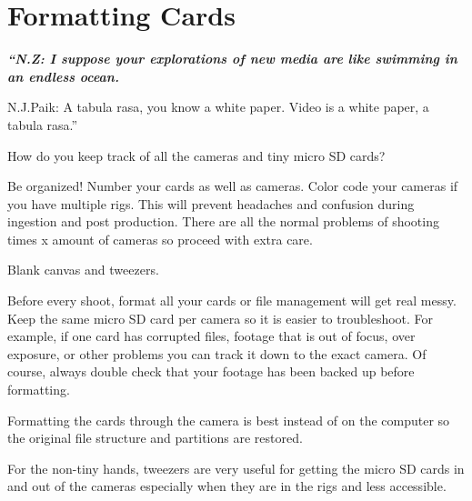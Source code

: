 \chapter{Formatting Cards}
\pagecolor{white}
\label{chap:4}
\begin{fullwidth}


{\itshape\bfseries “N.Z: I suppose your explorations of new media are like swimming in an endless ocean. 

N.J.Paik: A tabula rasa, you know a white paper. Video is a white paper, a tabula rasa.”}

\vspace{\baselineskip}

\problem

{\large How do you keep track of all the cameras and tiny micro SD cards? \par}

Be organized! Number your cards as well as cameras. Color code your cameras if you have multiple rigs. This will prevent headaches and confusion during ingestion and post production. There are all the normal problems of shooting times x amount of cameras so proceed with extra care. 


\solution

{\large Blank canvas and tweezers.
 \par}

Before every shoot, format all your cards or file management will get real messy. Keep the same micro SD card per camera so it is easier to troubleshoot. For example, if one card has corrupted files, footage that is out of focus, over exposure, or other problems you can track it down to the exact camera. Of course, always double check that your footage has been backed up before formatting. 

Formatting the cards through the camera is best instead of on the computer so the original file structure and partitions are restored. 


\tip For the non-tiny hands, tweezers are very useful for getting the micro SD cards in and out of the cameras especially when they are in the rigs and less accessible. 



\clearpage
\end{fullwidth}
